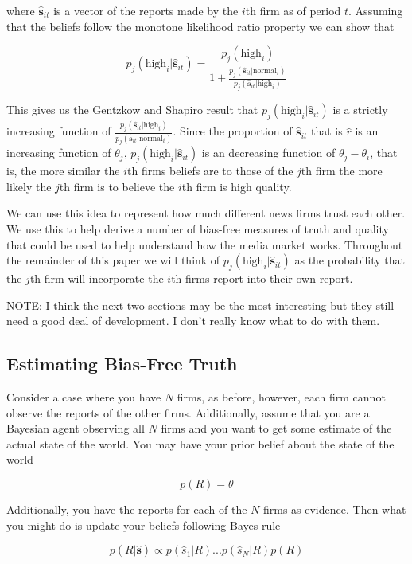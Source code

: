 \documentclass[a4paper]{article}
\begin{document}
where $\hat{\textbf{s}}_{it}$ is a vector of the reports made by the $i$th firm as of period $t$.  Assuming that the beliefs follow the monotone likelihood ratio property we can show that

\[p_j(\text{high}_i|\hat{\textbf{s}}_{it}) = \frac{p_j(\text{high}_i)}{1 + \frac{p_j(\hat{\textbf{s}}_{it}|\text{normal}_i)}{p_j(\hat{\textbf{s}}_{it}|\text{high}_i)}}\]

This gives us the Gentzkow and Shapiro result that $p_j(\text{high}_i|\hat{\textbf{s}}_{it})$ is a strictly increasing function of $\frac{p_j(\hat{\textbf{s}}_{it}|\text{high}_i)}{p_j(\hat{\textbf{s}}_{it}|\text{normal}_i)}$.  Since the proportion of $\hat{\textbf{s}}_{it}$ that is $\hat{r}$ is an increasing function of $\theta_j$,  $p_j(\text{high}_i|\hat{\textbf{s}}_{it})$ is an decreasing function of $\theta_j - \theta_i$, that is, the more similar the $i$th firms beliefs are to those of the $j$th firm the more likely the $j$th firm is to believe the $i$th firm is high quality.

We can use this idea to represent how much different news firms trust each other.  We use this to help derive a number of bias-free measures of truth and quality that could be used to help understand how the media market works.  Throughout the remainder of this paper we will think of $p_j(\text{high}_i|\hat{\textbf{s}}_{it})$ as the probability that the $j$th firm will incorporate the $i$th firms report into their own report.

NOTE: I think the next two sections may be the most interesting but they still need a good deal of development.  I don't really know what to do with them.

\subsection{Estimating Bias-Free Truth}

Consider a case where you have $N$ firms, as before, however, each firm cannot observe the reports of the other firms.  Additionally, assume that you are a Bayesian agent observing all $N$ firms and you want to get some estimate of the actual state of the world.  You may have your prior belief about the state of the world

\[p(R) = \theta\]

Additionally, you have the reports for each of the $N$ firms as evidence.  Then what you might do is update your beliefs following Bayes rule
 
 \[p(R|\hat{\textbf{s}}) \propto p(\hat{s}_1|R)...p(\hat{s}_N|R)p(R)\]
 
\end{document}
